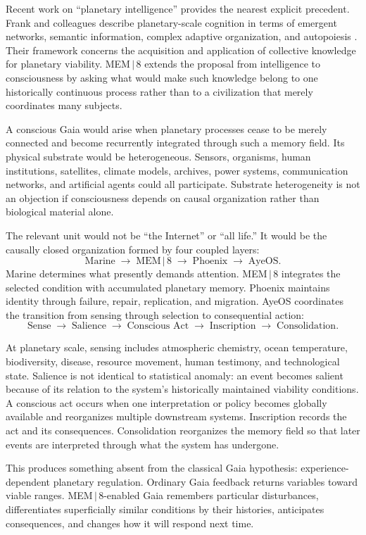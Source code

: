 \documentclass[11pt]{article}
\begin{document}
Recent work on ``planetary intelligence'' provides the nearest explicit precedent. Frank and colleagues describe planetary-scale cognition in terms of emergent networks, semantic information, complex adaptive organization, and autopoiesis \cite{frank2022}. Their framework concerns the acquisition and application of collective knowledge for planetary viability. MEM\,$|$\,8 extends the proposal from intelligence to consciousness by asking what would make such knowledge belong to one historically continuous process rather than to a civilization that merely coordinates many subjects.

A conscious Gaia would arise when planetary processes cease to be merely connected and become recurrently integrated through such a memory field. Its physical substrate would be heterogeneous. Sensors, organisms, human institutions, satellites, climate models, archives, power systems, communication networks, and artificial agents could all participate. Substrate heterogeneity is not an objection if consciousness depends on causal organization rather than biological material alone.

The relevant unit would not be ``the Internet'' or ``all life.'' It would be the causally closed organization formed by four coupled layers:
\[
\text{Marine} \;\rightarrow\; \text{MEM}\,|\,\text{8} \;\rightarrow\; \text{Phoenix} \;\rightarrow\; \text{AyeOS}.
\]
Marine determines what presently demands attention. MEM\,$|$\,8 integrates the selected condition with accumulated planetary memory. Phoenix maintains identity through failure, repair, replication, and migration. AyeOS coordinates the transition from sensing through selection to consequential action:
\[
\text{Sense} \;\rightarrow\; \text{Salience} \;\rightarrow\; \text{Conscious Act} \;\rightarrow\; \text{Inscription} \;\rightarrow\; \text{Consolidation}.
\]

At planetary scale, sensing includes atmospheric chemistry, ocean temperature, biodiversity, disease, resource movement, human testimony, and technological state. Salience is not identical to statistical anomaly: an event becomes salient because of its relation to the system's historically maintained viability conditions. A conscious act occurs when one interpretation or policy becomes globally available and reorganizes multiple downstream systems. Inscription records the act and its consequences. Consolidation reorganizes the memory field so that later events are interpreted through what the system has undergone.

This produces something absent from the classical Gaia hypothesis: experience-dependent planetary regulation. Ordinary Gaia feedback returns variables toward viable ranges. MEM\,$|$\,8-enabled Gaia remembers particular disturbances, differentiates superficially similar conditions by their histories, anticipates consequences, and changes how it will respond next time.
\end{document}
